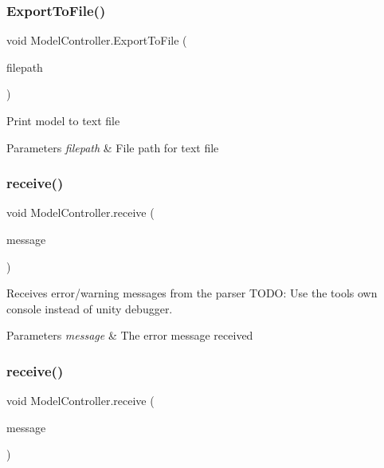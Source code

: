 \subsubsection{\texorpdfstring{Export\+To\+File()}{ExportToFile()}}
{\footnotesize\ttfamily void Model\+Controller.\+Export\+To\+File (\begin{DoxyParamCaption}\item[{string}]{filepath }\end{DoxyParamCaption})}



Print model to text file 


\begin{DoxyParams}{Parameters}
{\em filepath} & File path for text file\\
\hline
\end{DoxyParams}
\mbox{\label{class_model_controller_ace07b89fa66aa3855d9fd888e98d3c07}} 
\subsubsection{\texorpdfstring{receive()}{receive()}\hspace{0.1cm}{\footnotesize\ttfamily [1/2]}}
{\footnotesize\ttfamily void Model\+Controller.\+receive (\begin{DoxyParamCaption}\item[{M\+M.\+Parser.\+Parser\+Message}]{message }\end{DoxyParamCaption})}



Receives error/warning messages from the parser T\+O\+DO\+: Use the tools own console instead of unity debugger. 


\begin{DoxyParams}{Parameters}
{\em message} & The error message received\\
\hline
\end{DoxyParams}
\mbox{\label{class_model_controller_ad66a01d17f0bdff7f3a668e8dd37fd43}} 
\subsubsection{\texorpdfstring{receive()}{receive()}\hspace{0.1cm}{\footnotesize\ttfamily [2/2]}}
{\footnotesize\ttfamily void Model\+Controller.\+receive (\begin{DoxyParamCaption}\item[{M\+M.\+Runtime.\+Checker\+Message}]{message }\end{DoxyParamCaption})}



